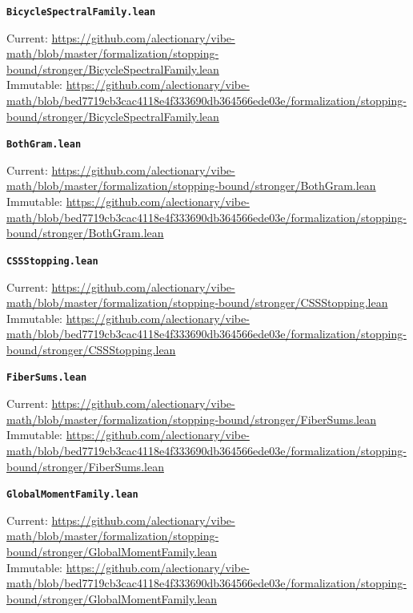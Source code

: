 \smallskip
\medskip
\par\noindent\textbf{\texttt{BicycleSpectralFamily.lean}}\par\nopagebreak
{\footnotesize\noindent Current: \url{https://github.com/alectionary/vibe-math/blob/master/formalization/stopping-bound/stronger/BicycleSpectralFamily.lean}\\
Immutable: \url{https://github.com/alectionary/vibe-math/blob/bed7719cb3cac4118e4f333690db364566ede03e/formalization/stopping-bound/stronger/BicycleSpectralFamily.lean}\par}
\smallskip
\medskip
\par\noindent\textbf{\texttt{BothGram.lean}}\par\nopagebreak
{\footnotesize\noindent Current: \url{https://github.com/alectionary/vibe-math/blob/master/formalization/stopping-bound/stronger/BothGram.lean}\\
Immutable: \url{https://github.com/alectionary/vibe-math/blob/bed7719cb3cac4118e4f333690db364566ede03e/formalization/stopping-bound/stronger/BothGram.lean}\par}
\smallskip
\medskip
\par\noindent\textbf{\texttt{CSSStopping.lean}}\par\nopagebreak
{\footnotesize\noindent Current: \url{https://github.com/alectionary/vibe-math/blob/master/formalization/stopping-bound/stronger/CSSStopping.lean}\\
Immutable: \url{https://github.com/alectionary/vibe-math/blob/bed7719cb3cac4118e4f333690db364566ede03e/formalization/stopping-bound/stronger/CSSStopping.lean}\par}
\smallskip
\medskip
\par\noindent\textbf{\texttt{FiberSums.lean}}\par\nopagebreak
{\footnotesize\noindent Current: \url{https://github.com/alectionary/vibe-math/blob/master/formalization/stopping-bound/stronger/FiberSums.lean}\\
Immutable: \url{https://github.com/alectionary/vibe-math/blob/bed7719cb3cac4118e4f333690db364566ede03e/formalization/stopping-bound/stronger/FiberSums.lean}\par}
\smallskip
\medskip
\par\noindent\textbf{\texttt{GlobalMomentFamily.lean}}\par\nopagebreak
{\footnotesize\noindent Current: \url{https://github.com/alectionary/vibe-math/blob/master/formalization/stopping-bound/stronger/GlobalMomentFamily.lean}\\
Immutable: \url{https://github.com/alectionary/vibe-math/blob/bed7719cb3cac4118e4f333690db364566ede03e/formalization/stopping-bound/stronger/GlobalMomentFamily.lean}\par}
